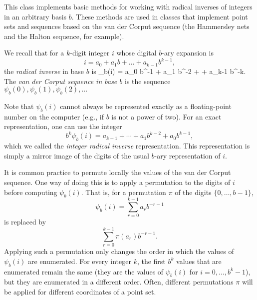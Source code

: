 
This class implements basic methods for working with radical
inverses of integers in an arbitrary basis $b$.
These methods are used in classes that implement
point sets and sequences based on the van der Corput sequence
(the Hammersley nets and the Halton sequence, for example).

We recall that for a $k$-digit integer $i$ whose digital 
$b$-ary expansion is
\[
  i = a_0 + a_1 b + \dots + a_{k-1} b^{k-1},
\]
the \emph{radical inverse} in base $b$ is
\eq
  \psi_b(i) = a_0 b^{-1} + a_1 b^{-2} + \cdots + a_{k-1} b^{-k}.
\endeq
The \emph{van der Corput sequence in base $b$} is the sequence
$\psi_b(0), \psi_b(1), \psi_b(2), \dots$ 

Note that $\psi_b(i)$ cannot always be represented exactly
as a floating-point number on the computer (e.g., if $b$ is not 
a power of two).  For an exact representation, one can use the integer 
\[
  b^k \psi_b(i) = a_{k-1} + \cdots + a_1 b^{k-2} + a_0 b^{k-1},
\]
which we called the \emph{integer radical inverse} representation.
This representation is simply a mirror image of the digits of the 
usual $b$-ary representation of $i$.

It is common practice to permute locally the values of the
van der Corput sequence.  One way of doing this is to apply a
permutation to the digits of $i$ before computing $\psi_b(i)$. 
That is, for a permutation $\pi$ of the digits $\{0,\dots,b-1\}$, 
\[
 \psi_{b}(i) = \sum_{r=0}^{k-1} a_r b^{-r-1} 
\]
is replaced by
\[
 \sum_{r=0}^{k-1} \pi(a_r) b^{-r-1}.
\]
Applying such a permutation only changes the order in which the 
values of $\psi_b(i)$ are enumerated.  For every integer $k$, the first
$b^k$ values that are enumerated remain the same (they are the values
of $\psi_b(i)$ for $i=0,\dots,b^k-1$), but they are enumerated in a 
different order.  Often, different permutations $\pi$ will be applied
for different coordinates of a point set.

